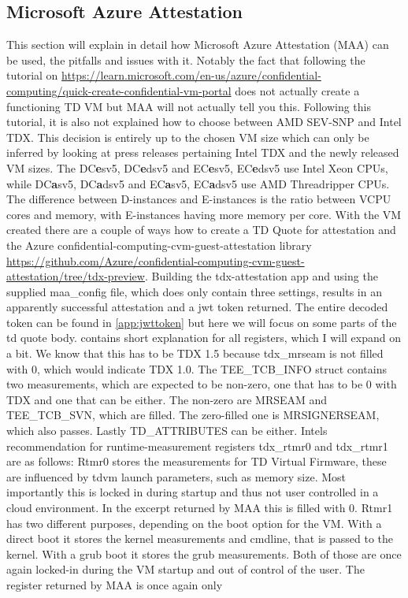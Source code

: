 

\subsection{Microsoft Azure Attestation}
This section will explain in detail how Microsoft Azure Attestation (MAA) can be used, the pitfalls and issues with it. Notably the fact that following the tutorial on \url{https://learn.microsoft.com/en-us/azure/confidential-computing/quick-create-confidential-vm-portal} does not actually create a functioning TD VM but MAA will not actually tell you this. Following this tutorial, it is also not explained how to choose between AMD SEV-SNP and Intel TDX. This decision is entirely up to the chosen VM size which can only be inferred by looking at press releases pertaining Intel TDX and the newly released VM sizes. The DC\textbf{e}sv5, DC\textbf{e}dsv5 and EC\textbf{e}sv5, EC\textbf{e}dsv5 use Intel Xeon CPUs, while DC\textbf{a}sv5, DC\textbf{a}dsv5 and EC\textbf{a}sv5, EC\textbf{a}dsv5 use AMD Threadripper CPUs. The difference between D-instances and E-instances is the ratio between VCPU cores and memory, with E-instances having more memory per core. With the VM created there are a couple of ways how to create a TD Quote for attestation and the Azure confidential-computing-cvm-guest-attestation library \url{https://github.com/Azure/confidential-computing-cvm-guest-attestation/tree/tdx-preview}. Building the tdx-attestation app and using the supplied maa\_config file, which does only contain three settings, results in an apparently successful attestation and a jwt token returned. The entire decoded token can be found in \ref{app:jwttoken} but here we will focus on some parts of the td quote body. \cite{dcap} contains short explanation for all registers, which I will expand on a bit. We know that this has to be TDX 1.5 because tdx\_mrseam is not filled with 0, which would indicate TDX 1.0. The TEE\_TCB\_INFO struct contains two measurements, which are expected to be non-zero, one that has to be 0 with TDX and one that can be either. The non-zero are MRSEAM and TEE\_TCB\_SVN, which are filled. The zero-filled one is MRSIGNERSEAM, which also passes. Lastly TD\_ATTRIBUTES can be either. Intels recommendation for runtime-measurement registers tdx\_rtmr0 and tdx\_rtmr1 are as follows: Rtmr0 stores the measurements for TD Virtual Firmware, these are influenced by tdvm launch parameters, such as memory size. Most importantly this is locked in during startup and thus not user controlled in a cloud environment. In the excerpt returned by MAA this is filled with 0. Rtmr1 has two different purposes, depending on the boot option for the VM. With a direct boot it stores the kernel measurements and cmdline, that is passed to the kernel. With a grub boot it stores the grub measurements. Both of those are once again locked-in during the VM startup and out of control of the user. The register returned by MAA is once again only 
